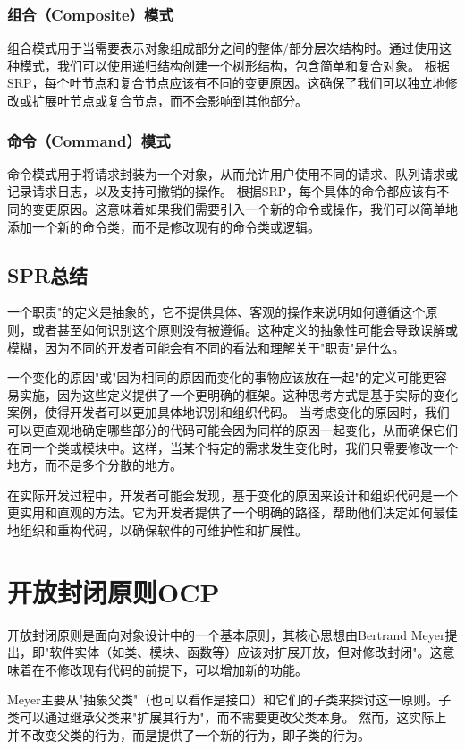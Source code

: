 \subsubsection{组合（Composite）模式}
组合模式用于当需要表示对象组成部分之间的整体/部分层次结构时。通过使用这种模式，我们可以使用递归结构创建一个树形结构，包含简单和复合对象。
根据SRP，每个叶节点和复合节点应该有不同的变更原因。这确保了我们可以独立地修改或扩展叶节点或复合节点，而不会影响到其他部分。
\subsubsection{命令（Command）模式}
命令模式用于将请求封装为一个对象，从而允许用户使用不同的请求、队列请求或记录请求日志，以及支持可撤销的操作。
根据SRP，每个具体的命令都应该有不同的变更原因。这意味着如果我们需要引入一个新的命令或操作，我们可以简单地添加一个新的命令类，而不是修改现有的命令类或逻辑。

\subsection{SPR总结}
一个职责"的定义是抽象的，它不提供具体、客观的操作来说明如何遵循这个原则，或者甚至如何识别这个原则没有被遵循。这种定义的抽象性可能会导致误解或模糊，因为不同的开发者可能会有不同的看法和理解关于"职责"是什么。

一个变化的原因"或"因为相同的原因而变化的事物应该放在一起"的定义可能更容易实施，因为这些定义提供了一个更明确的框架。这种思考方式是基于实际的变化案例，使得开发者可以更加具体地识别和组织代码。
当考虑变化的原因时，我们可以更直观地确定哪些部分的代码可能会因为同样的原因一起变化，从而确保它们在同一个类或模块中。这样，当某个特定的需求发生变化时，我们只需要修改一个地方，而不是多个分散的地方。

在实际开发过程中，开发者可能会发现，基于变化的原因来设计和组织代码是一个更实用和直观的方法。它为开发者提供了一个明确的路径，帮助他们决定如何最佳地组织和重构代码，以确保软件的可维护性和扩展性。

\section{开放封闭原则OCP}

开放封闭原则是面向对象设计中的一个基本原则，其核心思想由Bertrand Meyer提出，即"软件实体（如类、模块、函数等）应该对扩展开放，但对修改封闭"。这意味着在不修改现有代码的前提下，可以增加新的功能。

Meyer主要从"抽象父类"（也可以看作是接口）和它们的子类来探讨这一原则。子类可以通过继承父类来"扩展其行为"，而不需要更改父类本身。
然而，这实际上并不改变父类的行为，而是提供了一个新的行为，即子类的行为。

